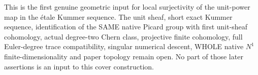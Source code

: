 This is the first genuine geometric input for local surjectivity of the unit-power map in the étale Kummer sequence. The unit sheaf, short exact Kummer sequence, identification of the SAME native Picard group with first unit-sheaf cohomology, actual degree-two Chern class, projective finite cohomology, full Euler-degree trace compatibility, singular numerical descent, WHOLE native $N^1$ finite-dimensionality and paper topology remain open. No part of those later assertions is an input to this cover construction.
